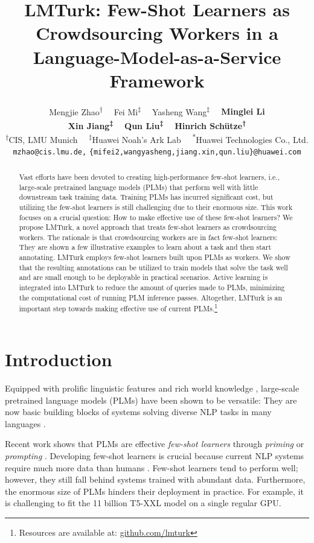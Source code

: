 \documentclass[11pt]{article}
\title{LMTurk: Few-Shot Learners as Crowdsourcing Workers in
  a Language-Model-as-a-Service Framework}
\author{
  Mengjie Zhao\textsuperscript{†}
  \ \ Fei Mi\textsuperscript{‡}
  \ \ Yasheng Wang\textsuperscript{‡}
  \ \ {\bf Minglei Li\textsuperscript{\normalfont{*}}}\\
  {\bf Xin Jiang\textsuperscript{‡}}
  \ \ {\bf Qun Liu\textsuperscript{‡}}
  \ \ {\bf Hinrich Sch\"{u}tze\textsuperscript{†}}\\
  \textsuperscript{†}CIS, LMU Munich
  \ \ \textsuperscript{‡}Huawei Noah's Ark Lab
  \ \ \textsuperscript{*}Huawei Technologies Co., Ltd.\\
  {\tt {\small mzhao@cis.lmu.de,}}
  {\tt {\small \{mifei2,wangyasheng,jiang.xin,qun.liu\}@huawei.com}}
}
\begin{document}
\maketitle

\begin{abstract}
  Vast efforts have been devoted to
  creating high-performance few-shot learners, i.e.,
  large-scale pretrained language models (PLMs)
  that perform well 
  with little downstream task training data.
  Training PLMs
  has incurred significant cost, but
  utilizing the few-shot learners is still
  challenging
  due to their enormous size.
  This work focuses on a crucial question:
  How to make effective use of these few-shot learners?
  We propose LMTurk, a novel approach that
  treats few-shot learners
  as crowdsourcing workers.
  The rationale is that
  crowdsourcing workers are in fact
  few-shot learners: They are shown
  a few illustrative examples
  to learn about a task and then
  start annotating.
  LMTurk employs few-shot learners
  built upon PLMs
  as workers.
  We show that the
  resulting annotations can be
  utilized to train
  models that
  solve the task well and are small enough to be deployable in
  practical scenarios.
  Active learning is integrated into LMTurk to
  reduce the amount of queries made to PLMs,
  minimizing the computational cost of running
  PLM inference passes.
  Altogether, LMTurk is
  an important step towards making
  effective use of
  current PLMs.\footnote{Resources are available at: \url{github.com/lmturk}}
\end{abstract}



\section{Introduction}

Equipped with prolific linguistic features
\citep{
  liulinguistic,tenney2018what,
  belinkov-glass-2019-analysis,BERTologypaper}
and rich world knowledge \citep{
  petroni-etal-2019-language,poerner-etal-2020-e,
  kassner-etal-2021-multilingual},
large-scale pretrained language models (PLMs) have been shown
to be versatile:
They are now basic
building blocks \citep{Fundationmodelpaper}
of systems solving diverse
NLP tasks in many languages
\citep{wang-etal-2018-glue,
  superglue,
  pmlr-v119-hu20b,
  xu-etal-2020-clue,
  Khashabi2020ParsiNLUAS,
  Park2021KLUEKL,  
  tacl_a_00416}.

Recent work shows that PLMs are effective \emph{few-shot learners}
\citep{GPT3paper,schick2020s,gao-etal-2021-making,Tam2021ImprovingAS}
through \emph{priming} \citep{GPT3paper,Tsimpoukelli2021MultimodalFL}
or \emph{prompting} \citep{lisaprefix,Ptuningpaper,Prompttuningpaper,xlmrprompting}.
Developing
few-shot learners is crucial
because current NLP systems 
require much more data than humans \citep{yin-etal-2020-universal}.
Few-shot learners tend to perform well;
however,
they still fall behind systems
trained with abundant data.  
Furthermore,
the enormous size of
PLMs
hinders their
deployment in
practice.
For example, it is challenging to fit
the 11 billion
T5-XXL \citep{t5paper} model
on a single regular GPU.
\end{document}
